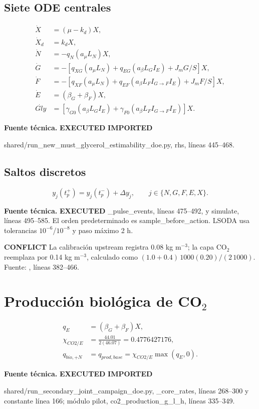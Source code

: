 \documentclass[11pt]{article}
\newcommand{\E}[1]{%
  \nobreak\hspace{0.16em}%
  \begingroup
  \setlength{\fboxsep}{1.5pt}%
  \colorbox{auditpale}{\textcolor{auditblue}{\sffamily\bfseries\scriptsize #1}}%
  \endgroup\hspace{0.16em}%
}
\newcommand{\code}[1]{{\small\ttfamily #1}}
\newcommand{\sourceinfo}[1]{%
  \par\vspace{-0.15em}%
  {\small\color{auditslate}\sffamily\textbf{Fuente técnica.}\enspace #1\par}%
  \vspace{0.25em}%
}
\begin{document}
\subsection{Siete ODE centrales}

\begin{align}
\dot X&=(\mu-k_d)X, \tag{R26}\\
\dot X_d&=k_dX, \tag{R27}\\
\dot N&=-q_N(a_\mu L_N)X, \tag{R28}\\
\dot G&=-\left[q_{XG}(a_\mu L_N)+q_{EG}(a_\beta L_GI_E)+J_mG/S\right]X, \tag{R29}\\
\dot F&=-\left[q_{XF}(a_\mu L_N)+q_{EF}(a_\beta L_FI_{G\to F}I_E)+J_mF/S\right]X, \tag{R30}\\
\dot E&=(\beta_G+\beta_F)X, \tag{R31}\\
\dot{Gly}&=\left[\gamma_{G0}(a_\beta L_GI_E)+
\gamma_{F0}(a_\beta L_FI_{G\to F}I_E)\right]X. \tag{R32}
\end{align}
\sourceinfo{\E{EXECUTED}\E{IMPORTED}
\code{shared/run\_new\_must\_glycerol\_estimability\_doe.py},
\code{rhs}, líneas 445--468.}

\subsection{Saltos discretos}

\begin{equation}
y_j(t_p^+)=y_j(t_p^-)+\Delta y_j,\qquad
j\in\{N,G,F,E,X\}. \tag{R33}
\end{equation}
\sourceinfo{\E{EXECUTED} \code{\_pulse\_events}, líneas 475--492, y
\code{simulate}, líneas 495--585. El orden predeterminado es
\code{sample\_before\_action}. LSODA usa tolerancias $10^{-6}$/$10^{-8}$ y
paso máximo 2 h.}

\E{CONFLICT} La calibración upstream registra 0.08 kg m$^{-3}$; la capa CO$_2$
reemplaza por 0.14 kg m$^{-3}$, calculado como
$(1.0+0.4)\,1000(0.20)/(2\,1000)$. Fuente:
, líneas 382--466.

\section{Producción biológica de CO$_2$}

\begin{align}
q_E&=(\beta_G+\beta_F)X, \tag{R34}\\
\chi_{CO2/E}&=\frac{44.01}{2(46.07)}=0.4776427176, \tag{R35}\\
q_{bio,+N}&=q_{prod,base}=\chi_{CO2/E}\max(q_E,0). \tag{R36}
\end{align}
\sourceinfo{\E{EXECUTED}\E{IMPORTED}
\code{shared/run\_secondary\_joint\_campaign\_doe.py}, \code{\_core\_rates},
líneas 268--300 y constante línea 166; módulo pilot,
\code{co2\_production\_g\_l\_h}, líneas 335--349.}
\end{document}
